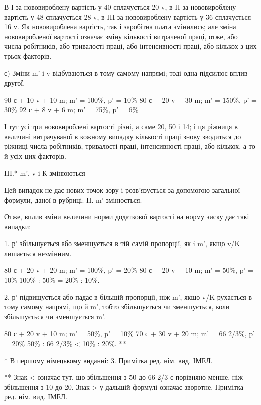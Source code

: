 В І за нововироблену вартість у 40 сплачується 20 v, в II
за нововироблену вартість у 48 сплачується 28 v, в III за нововироблену
вартість у 36 сплачується 16 v. Як нововироблена
вартість, так і заробітна плата змінились; але зміна нововиробленої
вартості означає зміну кількості витраченої праці, отже,
або числа робітників, або тривалості праці, або інтенсивності
праці, або кількох з цих трьох факторів.

с) Зміни m' і v відбуваються в тому самому напрямі; тоді
одна підсилює вплив другої.

90 с + 10 v + 10 m; m' = 100\%, p' = 10\%
80 с + 20 v + 30 m; m' = 150\%, p' = 30\%
92 с + 8 v + 6 m; m' = 75\%, p' = 6\%

І тут усі три нововироблені вартості різні, а саме 20, 50 і 14;
і ця ріжниця в величині витрачуваної в кожному випадку кількості
праці знову зводиться до ріжниці числа робітників, тривалості
праці, інтенсивності праці, або кількох, а то й усіх цих факторів.

III.* m', v і К змінюються

Цей випадок не дає нових точок зору і розв’язується за допомогою
загальної формули, даної в рубриці: II. m' змінюється.

Отже, вплив зміни величини норми додаткової вартості на
норму зиску дає такі випадки:

1. р' збільшується або зменшується в тій самій пропорції, як
i m', якщо v/K  лишається незмінним.

80 с + 20 v + 20 m; m' = 100\%, p' = 20\%
80 с + 20 v + 10 m; m' = 50\%, p' = 10\%
100\% : 50\% = 20\% : 10\%.

2. р' підвищується або падає в більшій пропорції, ніж m',
якщо v/K рухається в тому самому напрямі, що й m', тобто
збільшується чи зменшується, коли збільшується чи зменшується
m'.

80 с + 20 v + 10 m; m' = 50\%, p' = 10\%
70 с + 30 v + 20 m; m' = 66 2/3\%, p' = 20\%
50\% : 66 2/3\% < 10\% : 20\%. **

* В першому німецькому виданні: 3. Примітка ред. нім. вид. ІМЕЛ.

** Знак < означає тут, що збільшення з 50 до 66 2/3 є порівняно менше, ніж
збільшення з 10 до 20. Знак > у дальшій формулі означає зворотне. Примітка
ред. нім. вид. ІМЕЛ.
